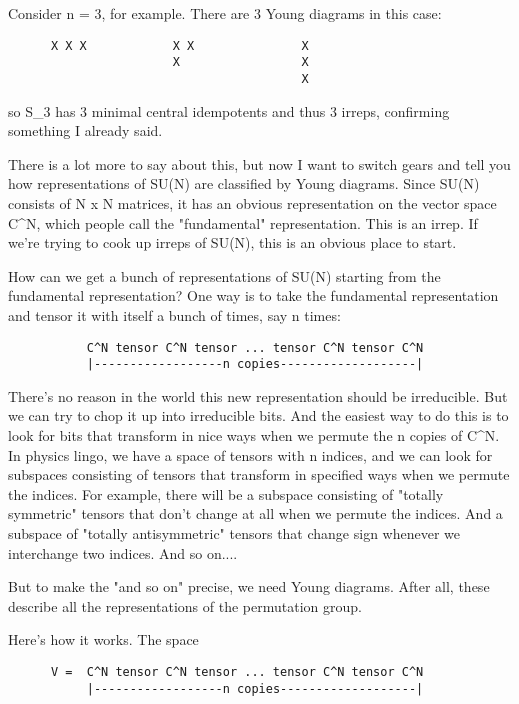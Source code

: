 Consider n = 3, for example.  There are 3 Young diagrams in this case:
\begin{verbatim}
      X X X            X X               X
                       X                 X
                                         X
\end{verbatim}
    
so S_{3} has 3 minimal central idempotents and thus 3 irreps,
confirming something I already said.

There is a lot more to say about this, but now I want to switch gears
and tell you how representations of SU(N) are classified by Young
diagrams.   Since SU(N) consists of N x N matrices, it has an obvious
representation on the vector space C^N, which people call the
"fundamental" representation.   This is an irrep.  If we're trying to
cook up irreps of SU(N), this is an obvious place to start.

How can we get a bunch of representations of SU(N) starting from the
fundamental representation?  One way is to take the fundamental
representation and tensor it with itself a bunch of times, say n times:

\begin{verbatim}
           C^N tensor C^N tensor ... tensor C^N tensor C^N
           |------------------n copies-------------------|

\end{verbatim}
    
There's no reason in the world this new representation should be
irreducible.  But we can try to chop it up into irreducible bits.  And
the easiest way to do this is to look for bits that transform in nice
ways when we permute the n copies of C^N.  In physics lingo, we have a
space of tensors with n indices, and we can look for subspaces
consisting of tensors that transform in specified ways when we permute
the indices.  For example, there will be a subspace consisting of
"totally symmetric" tensors that don't change at all when we
permute the indices.  And a subspace of "totally
antisymmetric" tensors that change sign whenever we interchange two
indices.  And so on....

But to make the "and so on" precise, we need Young diagrams.  After all,
these describe all the representations of the permutation group.  

Here's how it works.  The space 

\begin{verbatim}
      V =  C^N tensor C^N tensor ... tensor C^N tensor C^N
           |------------------n copies-------------------|

\end{verbatim}
    
